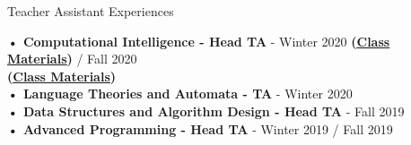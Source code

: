 \documentclass{resume} %
\begin{document}
\begin{rSection}{Teacher Assistant Experiences}

\textbf{• Computational Intelligence - Head TA} - Winter 2020 \textbf{(\underline{\href{https://github.com/alitourani/ci-class-9802}{Class Materials}})} / Fall 2020\\ \textbf{(\underline{\href{https://github.com/alitourani/computational-intelligence-class-9901}{Class Materials}})} \\
\textbf{• Language Theories and Automata - TA} - Winter 2020 \\
\textbf{• Data Structures and Algorithm Design - Head TA} - Fall 2019 \\
\textbf{• Advanced Programming - Head TA} - Winter 2019 / Fall 2019 \\

\end{rSection}
\end{document}
